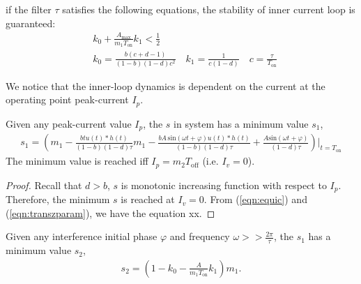 \begin{theorem}
if the filter $\tau$ satisfies the following equations, the stability of inner current loop is guaranteed:
\begin{align}
    & k_0 + \frac{A_{\text{max}}}{m_1 T_{\text{on}}} k_1 < \frac{1}{2} \nonumber \\
    & k_0 = \frac{b(c+d-1)}{(1-b)(1-d)c^2} \quad k_1 = \frac{1}{c(1-d)} \quad c = \frac{\tau}{T_{\text{on}}}
\end{align}
\end{theorem}
We notice that the inner-loop dynamics is dependent on the current at the operating point peak-current $I_p$.
\begin{proposition}
Given any peak-current value $I_p$, the $s$ in system has a minimum value $s_1$, 
\begin{align} \label{eqn:s_lower_bound1}
    s_1 = \left( m_1 - \frac{b tu(t)*h(t)}{(1-b)(1-d)\tau} m_1-\frac{b A\, \text{sin}(\omega t+\varphi) u(t)*h(t)}{(1-b)(1-d)\tau} + \frac{A\text{sin}(\omega t+\varphi)}{(1-d)\tau} \right) \bigg\vert_{t = T_{\text{on}}}
\end{align}
The minimum value is reached iff  $I_p = m_2 T_{\text{off}}$ (i.e. $I_v = 0$).
\end{proposition}
\begin{proof}
 Recall that $d > b$, $s$ is monotonic increasing function with respect to $I_p$. Therefore, the minimum $s$ is reached at $I_v = 0$. From (\ref{eqn:equic}) and (\ref{eqn:transzparam}), we have the equation xx.
\end{proof}
\begin{proposition}
Given any interference initial phase $\varphi$ and frequency $\omega >> \frac{2\pi}{\tau}$, the $s_1$ has a minimum value $s_2$,
\begin{align} \label{eqn:s_lower_bound2}
    s_2 = \left( 1- k_0 - \frac{A}{m_1 T_{\text{on}}} k_1 \right)m_1.
\end{align}
\end{proposition}

